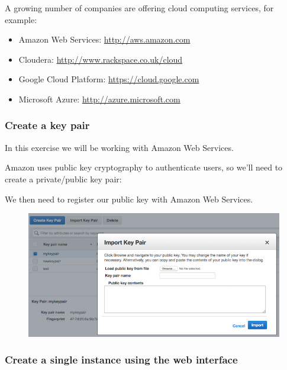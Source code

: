 A growing number of companies are offering cloud computing services, for
example:

\begin{itemize}
\itemsep1pt\parskip0pt
\item
  Amazon Web Services: \url{http://aws.amazon.com}
\item
  Cloudera: \url{http://www.rackspace.co.uk/cloud}
\item
  Google Cloud Platform: \url{https://cloud.google.com}
\item
  Microsoft Azure: \url{http://azure.microsoft.com}
\end{itemize}

\subsubsection{Create a key pair}\label{create-a-key-pair}

In this exercise we will be working with Amazon Web Services.

Amazon uses public key cryptography to authenticate users, so we'll need
to create a private/public key pair:

\begin{Shaded}
\begin{Highlighting}[]
\NormalTok{$ } 
\end{Highlighting}
\end{Shaded}

We then need to register our public key with Amazon Web Services.

\begin{figure}[htbp]
\centering
\includegraphics{10Cloud/figures/key_pair.png}
\end{figure}

\subsubsection{Create a single instance using the web
interface}\label{create-a-single-instance-using-the-web-interface}

